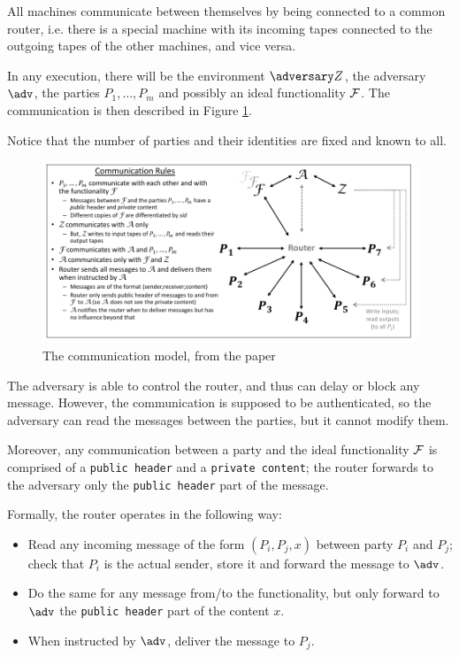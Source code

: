 All machines communicate between themselves by being connected to a common router, i.e. there is a special machine with its incoming tapes connected to the outgoing tapes of the other machines, and vice versa.

In any execution, there will be the environment $\zdv$, the adversary $\adv$, the parties $P_1,\dots,P_m$ and possibly an ideal functionality $\mathcal{F}$. The communication is then described in Figure \ref{SUC_router}.

Notice that the number of parties and their identities are fixed and known to all.

\begin{figure}
    \includegraphics[scale=0.9]{router}
    \caption{The communication model, from the \cite{Canetti_SUC} paper}
    \label{SUC_router}
\end{figure}

The adversary is able to control the router, and thus can delay or block any message. However, the communication is supposed to be authenticated, so the adversary can read the messages between the parties, but it cannot modify them.

Moreover, any communication between a party and the ideal functionality $\mathcal{F}$ is comprised of a \texttt{public header} and a \texttt{private content}; the router forwards to the adversary only the \texttt{public header} part of the message.

Formally, the router operates in the following way:
\begin{itemize}
    \item Read any incoming message of the form $(P_i,P_j,x)$ between party $P_i$ and $P_j$; check that $P_i$ is the actual sender, store it and forward the message to $\adv$.
    \item Do the same for any message from/to the functionality, but only forward to $\adv$ the \texttt{public header} part of the content $x$.
    \item When instructed by $\adv$, deliver the message to $P_j$.
\end{itemize}

